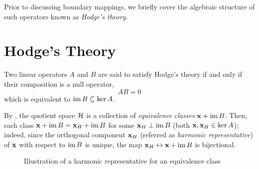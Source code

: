 Prior to discussing boundary mappings, we briefly cover the algebraic structure of such operators known as \emph{Hodge's theory}.

\section{ Hodge's Theory }

Two linear operators \( A \) and \( B \) are said to satisfy Hodge's theory if and only if their composition is a null operator, 
\begin{equation}
      A B = 0
\end{equation}
which is equivalent to \( \operatorname{im} B \subseteq \ker A \).


By , the quotient space \( \mathcal{H} \) is a collection of \emph{equivalence classes} \( \mathbf{x} + \operatorname{im} B \). Then, each class \( \mathbf{x} + \operatorname{im} B = \mathbf{x}_H + \operatorname{im} B \) for some \( \mathbf{x}_H \perp \operatorname{im} B \) (both \( \mathbf{x}, \mathbf{x}_H \in \ker A \)); indeed, since the orthogonal component \( \mathbf{x}_H \) (referred as \emph{harmonic representative}) of \( \mathbf{x} \) with respect to \( \operatorname{im} B\) is unique, the map \( \mathbf{x}_H \leftrightarrow \mathbf{x} + \operatorname{im} B \) is bijectional.

\begin{figure}[hbtp]
      \centering
            
            \caption{Illustration of a harmonic representative for an equivalence class}
\end{figure}


